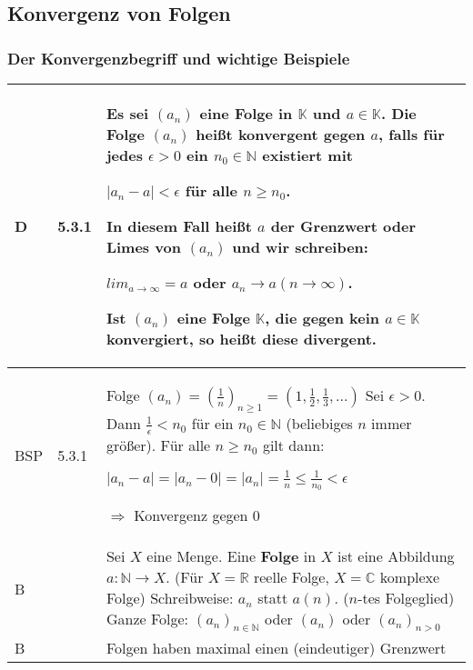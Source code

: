\pagebreak

\subsection{Konvergenz von Folgen}
\subsubsection{Der Konvergenzbegriff und wichtige Beispiele}
      
    \begin{longtable}{p{0.75cm} p{1cm} p{16cm}}
        \toprule
        
        D   & 5.3.1 &   Es sei $(a_n)$ eine Folge in $\mathbb{K}$ und $a \in \mathbb{K}$. Die Folge $(a_n)$ heißt \textbf{konvergent} gegen $a$,
                        falls für jedes $\epsilon > 0$ ein $n_0 \in \mathbb{N}$ existiert mit \hfill \break
                        \centerline{$|a_n-a| < \epsilon$ für alle $n \geq n_0$.}
                        In diesem Fall heißt $a$ der \textbf{Grenzwert} oder Limes von $(a_n)$ und wir schreiben: \hfill \break
                        \centerline{$lim_{a \rightarrow \infty} = a$ oder $a_n \rightarrow a (n \rightarrow \infty)$.} 
                        Ist $(a_n)$ eine Folge $\mathbb{K}$, die gegen kein $a \in \mathbb{K}$ konvergiert, so heißt diese \textbf{divergent}. \\
        \midrule
        BSP & 5.3.1 &   Folge $(a_n) = (\frac{1}{n})_{n\geq 1} = (1, \frac{1}{2}, \frac{1}{3},...)$ \hfill \break
                        Sei $\epsilon > 0$. Dann $\frac{1}{\epsilon} < n_0$ für ein $n_0 \in \mathbb{N}$ (beliebiges $n$ immer größer). \hfill \break 
                        Für alle $n \geq n_0$ gilt dann: \hfill \break
                        \centerline{$|a_n - a| = |a_n - 0| = |a_n| = \frac{1}{n} \leq \frac{1}{n_0} < \epsilon$}
                        $\Rightarrow$ Konvergenz gegen 0 \\
        \midrule
        B   &       &   Sei $X$ eine Menge. Eine \textbf{Folge} in $X$ ist eine Abbildung $a: \mathbb{N} \rightarrow X$. \hfill \break
                        (Für $X = \mathbb{R}$ reelle Folge, $X = \mathbb{C}$ komplexe Folge) \hfill \break
                        Schreibweise: $a_n$ statt $a(n)$. ($n$-tes Folgeglied) \hfill \break
                        Ganze Folge: $(a_n)_{n \in \mathbb{N}}$ oder $(a_n)$ oder $(a_n)_{n>0}$ \\
        \midrule
        B   &       &   Folgen haben maximal einen (eindeutiger) Grenzwert \\

\end{longtable}
